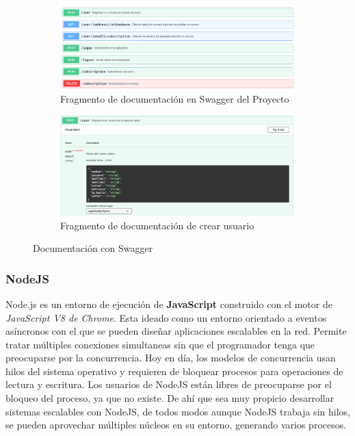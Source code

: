\begin{figure}[hbt]
	\centering
	\begin{subfigure}[b]{0.4\linewidth}
		\centering
        \includegraphics[width=0.6\linewidth]{figs/Desarrollo/Swagger}
        \caption[Swagger]{Fragmento de documentación en Swagger del Proyecto}
	\end{subfigure} 
	\begin{subfigure}[b]{0.4\linewidth}
		\centering
        \includegraphics[width=0.6\linewidth]{figs/Desarrollo/SwaggerUsuario}
        \caption[Swagger Usuario]{Fragmento de documentación de crear usuario}
	\end{subfigure} 
	\caption[Swagger]{Documentación con Swagger}
	\label{fig:programas}
\end{figure}

\subsubsection{NodeJS}
Node.js\cite{nodejs} es un entorno de ejecución de \textbf{JavaScript} construido con el motor de \emph{JavaScript V8 de Chrome}. Esta ideado como un entorno orientado a eventos asíncronos con el que se pueden diseñar aplicaciones escalables en la red. Permite tratar múltiples conexiones simultaneas sin que el programador tenga que preocuparse por la concurrencia. Hoy en día, los modelos de concurrencia usan hilos del sistema operativo y requieren de bloquear procesos para operaciones de lectura y escritura. Los usuarios de NodeJS están libres de preocuparse por el bloqueo del proceso, ya que no existe. De ahí que sea muy propicio desarrollar sistemas escalables con NodeJS, de todos modos aunque NodeJS trabaja sin hilos, se pueden aprovechar múltiples núcleos en su entorno, generando varios procesos. \\

